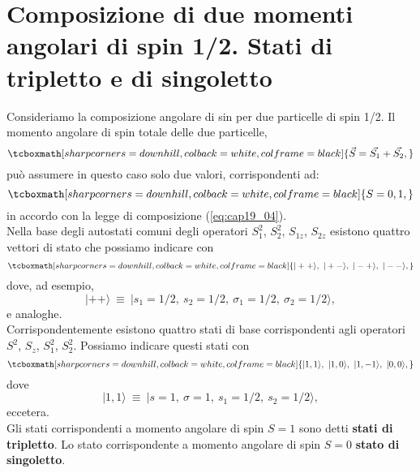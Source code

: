 \documentclass[a4paper,12pt,oneside]{book}
\begin{document}
\section[Composizione di due momenti angolari di spin 1/2. Stati di tripletto e di singoletto]{Composizione di due momenti angolari di spin 1/2. Stati di tripletto e di singoletto}
Consideriamo la composizione angolare di sin per due particelle di spin 1/2. Il momento angolare di spin totale delle due particelle,
	\begin{equation}
		\tcboxmath[sharp corners=downhill, colback=white, colframe=black]{
			\vec{S} = \vec{S_1} + \vec{S_2} ,
			}
	\end{equation}
può assumere in questo caso solo due valori, corrispondenti ad:
	\begin{equation}
		\tcboxmath[sharp corners=downhill, colback=white, colframe=black]{
			S= 0, 1 ,
			}
	\end{equation}
in accordo con la legge di composizione (\ref{eq:cap19_04}).\\

Nella base degli autostati comuni degli operatori $S_1^2$, $S_2^2$, $ S_{1z}$, $S_{2z}$ esistono quattro vettori di stato che possiamo indicare con  
	\begin{equation}
		\tcboxmath[sharp corners=downhill, colback=white, colframe=black]{
			|++\rangle ,~ |+-\rangle,~ |-+\rangle , ~|--\rangle  ,
			}
	\end{equation}
dove, ad esempio,
	\begin{equation}
		|++\rangle~ \equiv ~|s_1=1/2, ~s_2=1/2,~\sigma_1 = 1/2, ~\sigma_2 = 1/2\rangle ,
	\end{equation}
e analoghe. \\

Corrispondentemente esistono quattro stati di base corrispondenti agli operatori $S^2$, $S_z$, $S_1^2$, $S_2^2$. Possiamo indicare questi stati con 
	\begin{equation}
		\tcboxmath[sharp corners=downhill, colback=white, colframe=black]{
			|1,1\rangle, ~|1,0\rangle, ~|1,-1\rangle, ~|0,0\rangle ,
			}
	\end{equation}
dove
	\begin{equation}
		|1,1\rangle ~\equiv~ |s=1, ~ \sigma=1, ~s_1=1/2, ~s_2=1/2\rangle ,
	\end{equation}
eccetera. \\

Gli stati corrispondenti a momento angolare di spin $S=1$ sono detti \textbf{stati di tripletto}. Lo stato corrispondente a momento angolare di spin $S=0$ \textbf{stato di singoletto}. \\
\end{document}
